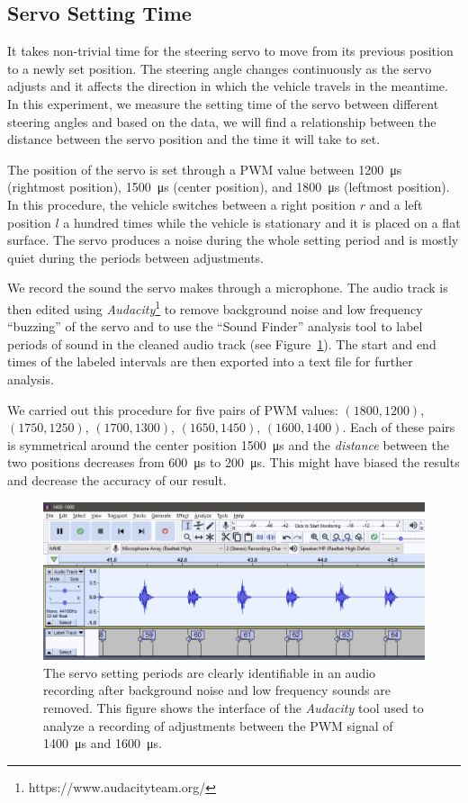 \subsection{Servo Setting Time}

It takes non-trivial time for the steering servo to move from its previous position to a newly set position. The steering angle changes continuously as the servo adjusts and it affects the direction in which the vehicle travels in the meantime. In this experiment, we measure the setting time of the servo between different steering angles and based on the data, we will find a relationship between the distance between the servo position and the time it will take to set.

The position of the servo is set through a \gls{PWM} value between \SI{1200}{\micro\second} (rightmost position), \SI{1500}{\micro\second} (center position), and \SI{1800}{\micro\second} (leftmost position). In this procedure, the vehicle switches between a right position $r$ and a left position $l$ a hundred times while the vehicle is stationary and it is placed on a flat surface. The servo produces a noise during the whole setting period and is mostly quiet during the periods between adjustments.

We record the sound the servo makes through a microphone. The audio track is then edited using \textit{Audacity}\footnote{https://www.audacityteam.org/} to remove background noise and low frequency ``buzzing'' of the servo and to use the ``Sound Finder'' analysis tool to label periods of sound in the cleaned audio track (see Figure~\ref{fig:audacity}). The start and end times of the labeled intervals are then exported into a text file for further analysis.

We carried out this procedure for five pairs of \gls*{PWM} values: $(1800, 1200)$, $(1750, 1250)$, $(1700, 1300)$, $(1650, 1450)$, $(1600, 1400)$. Each of these pairs is symmetrical around the center position \SI{1500}{\micro\second} and the \textit{distance} between the two positions decreases from \SI{600}{\micro\second} to \SI{200}{\micro\second}. This might have biased the results and decrease the accuracy of our result.

\begin{figure}
	\includegraphics[width=\textwidth]{../img/servo_experiment_audacity}
	\protect\caption{The servo setting periods are clearly identifiable in an audio recording after background noise and low frequency sounds are removed. This figure shows the interface of the \textit{Audacity} tool used to analyze a recording of adjustments between the PWM signal of \SI{1400}{\micro\second} and \SI{1600}{\micro\second}.}
	\label{fig:audacity}
\end{figure}

